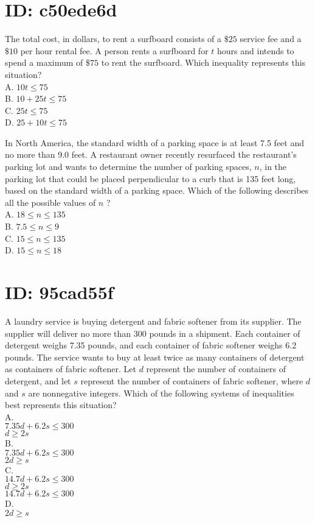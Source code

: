 \section*{ID: c50ede6d}
The total cost, in dollars, to rent a surfboard consists of a $\$ 25$ service fee and a $\$ 10$ per hour rental fee. A person rents a surfboard for $t$ hours and intends to spend a maximum of $\$ 75$ to rent the surfboard. Which inequality represents this situation?\\
A. $10 t \leq 75$\\
B. $10+25 t \leq 75$\\
C. $25 t \leq 75$\\
D. $25+10 t \leq 75$







In North America, the standard width of a parking space is at least 7.5 feet and no more than 9.0 feet. A restaurant owner recently resurfaced the restaurant's parking lot and wants to determine the number of parking spaces, $n$, in the parking lot that could be placed perpendicular to a curb that is 135 feet long, based on the standard width of a parking space. Which of the following describes all the possible values of $n$ ?\\
A. $18 \leq n \leq 135$\\
B. $7.5 \leq n \leq 9$\\
C. $15 \leq n \leq 135$\\
D. $15 \leq n \leq 18$






\section*{ID: 95cad55f}
A laundry service is buying detergent and fabric softener from its supplier. The supplier will deliver no more than 300 pounds in a shipment. Each container of detergent weighs 7.35 pounds, and each container of fabric softener weighs 6.2 pounds. The service wants to buy at least twice as many containers of detergent as containers of fabric softener. Let $d$ represent the number of containers of detergent, and let $s$ represent the number of containers of fabric softener, where $d$ and $s$ are nonnegative integers. Which of the following systems of inequalities best represents this situation?\\
A.\\
$7.35 d+6.2 s \leq 300$\\
$d \geq 2 s$\\
B.\\
$7.35 d+6.2 s \leq 300$\\
$2 d \geq s$\\
C.\\
$14.7 d+6.2 s \leq 300$\\
$d \geq 2 s$\\
$14.7 d+6.2 s \leq 300$\\
D.\\
$2 d \geq s$











